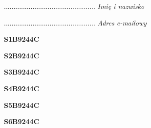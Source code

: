 \begin{turn}{90}\begin{minipage}{\linewidth} \vspace{20mm} ................................................  \textit{Imię i nazwisko}\end{minipage}\end{turn}

\begin{turn}{90}\begin{minipage}{\linewidth} \vspace{20mm} ................................................  \textit{Adres e-mailowy}\end{minipage}\end{turn}

\begin{turn}{90}\huge \begin{minipage}{\linewidth} \vspace{10mm}\textbf{S1B9244C}\end{minipage}\end{turn}

\begin{turn}{90}\huge \begin{minipage}{\linewidth} \vspace{10mm}\textbf{S2B9244C}\end{minipage}\end{turn}

\begin{turn}{90}\huge \begin{minipage}{\linewidth} \vspace{10mm}\textbf{S3B9244C}\end{minipage}\end{turn}

\begin{turn}{90}\huge \begin{minipage}{\linewidth} \vspace{10mm}\textbf{S4B9244C}\end{minipage}\end{turn}

\begin{turn}{90}\huge \begin{minipage}{\linewidth} \vspace{10mm}\textbf{S5B9244C}\end{minipage}\end{turn}

\begin{turn}{90}\huge \begin{minipage}{\linewidth} \vspace{10mm}\textbf{S6B9244C}\end{minipage}\end{turn}

